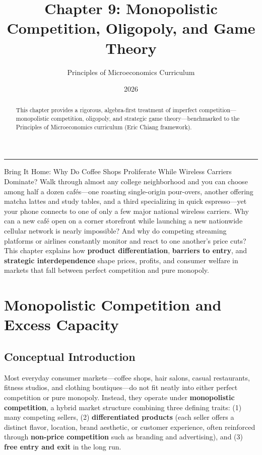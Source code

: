 \documentclass[11pt,letterpaper]{article}
\begin{document}
\title{\Huge\bfseries\color{SlateBlue} Chapter 9: Monopolistic Competition, Oligopoly, and Game Theory}
\author{\large Principles of Microeconomics Curriculum}
\date{2026}
\maketitle

\thispagestyle{plain}

\begin{abstract}
This chapter provides a rigorous, algebra-first treatment of imperfect competition—monopolistic competition, oligopoly, and strategic game theory—benchmarked to the Principles of Microeconomics curriculum (Eric Chiang framework).
\end{abstract}

\tableofcontents
\vspace{1.5em}
\hrule
\vspace{1.5em}

\begin{examplecase}{Bring It Home: Why Do Coffee Shops Proliferate While Wireless Carriers Dominate?}
Walk through almost any college neighborhood and you can choose among half a dozen cafés—one roasting single-origin pour-overs, another offering matcha lattes and study tables, and a third specializing in quick espresso—yet your phone connects to one of only a few major national wireless carriers. Why can a new café open on a corner storefront while launching a new nationwide cellular network is nearly impossible? And why do competing streaming platforms or airlines constantly monitor and react to one another's price cuts? This chapter explains how \textbf{product differentiation}, \textbf{barriers to entry}, and \textbf{strategic interdependence} shape prices, profits, and consumer welfare in markets that fall between perfect competition and pure monopoly.
\end{examplecase}

\section{Monopolistic Competition and Excess Capacity}

\subsection*{Conceptual Introduction}
Most everyday consumer markets—coffee shops, hair salons, casual restaurants, fitness studios, and clothing boutiques—do not fit neatly into either perfect competition or pure monopoly. Instead, they operate under \textbf{monopolistic competition}, a hybrid market structure combining three defining traits: (1) many competing sellers, (2) \textbf{differentiated products} (each seller offers a distinct flavor, location, brand aesthetic, or customer experience, often reinforced through \textbf{non-price competition} such as branding and advertising), and (3) \textbf{free entry and exit} in the long run.
\end{document}
